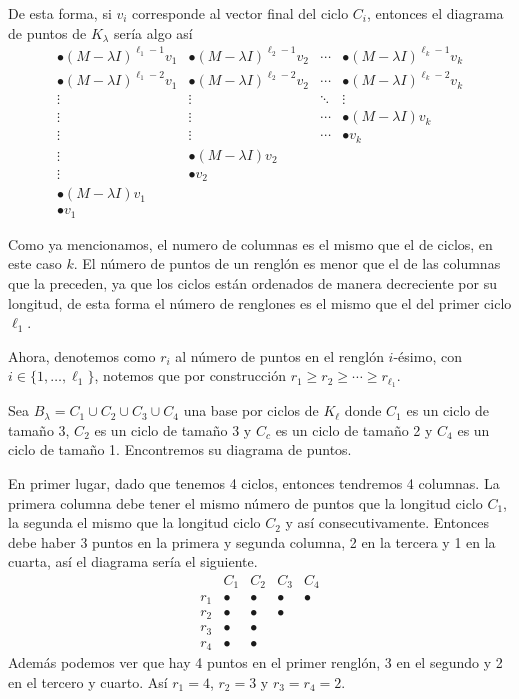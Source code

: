 De esta forma, si $v_i$ corresponde al vector final del ciclo $C_i$, entonces el diagrama de puntos de $K_\lambda
$ sería algo así
\[
  \begin{array}{llll} 
    \bullet (M-\lambda I)^{\ell_1-1}v_1 & \bullet (M-\lambda I)^{\ell_2-1}v_2 & \cdots & \bullet (M-\lambda I)^{\ell_k-1}v_k  \\
    \bullet (M-\lambda I)^{\ell_1-2}v_1 & \bullet (M-\lambda I)^{\ell_2-2}v_2 & \cdots & \bullet (M-\lambda I)^{\ell_k-2}v_k  \\
    \vdots & \vdots & \ddots & \vdots \\
    \vdots & \vdots & \cdots & \bullet (M-\lambda I)v_k \\
    \vdots & \vdots & \cdots & \bullet v_k \\
    \vdots & \bullet (M-\lambda I)v_2 \\
    \vdots & \bullet v_2 \\
    \bullet (M-\lambda I)v_1 \\
    \bullet v_1 
  \end{array}
\]

Como ya mencionamos, el numero de columnas es el mismo que el de ciclos, en este caso $k$. El número de puntos de un renglón es menor que el de las columnas que la preceden, ya que los ciclos están ordenados de manera decreciente por su longitud, de esta forma el número de renglones es el mismo que el del primer ciclo $\ell_1$. 

Ahora, denotemos como $r_i$ al número de puntos en el renglón $i$-ésimo, con $i \in \{1,\ldots,\ell_1\}$, notemos que por construcción $r_1 \geq r_2 \geq \cdots \geq r_{\ell_1}$.

\begin{example}
  Sea $B_\lambda = C_1 \cup C_2 \cup C_3 \cup C_4$ una base por ciclos de $K_\ell$ donde $C_1$ es un ciclo de tamaño 3, $C_2$ es un ciclo de tamaño 3 y $C_c$ es un ciclo de tamaño 2 y $C_4$ es un ciclo de tamaño 1. Encontremos su diagrama de puntos.

  \examplesolution

  En primer lugar, dado que tenemos 4 ciclos, entonces tendremos 4 columnas. La primera columna debe tener el mismo número de puntos que la longitud ciclo $C_1$, la segunda el mismo que la longitud ciclo $C_2$ y así consecutivamente. Entonces debe haber 3 puntos en la primera y segunda columna, 2 en la tercera y 1 en la cuarta, así el diagrama sería el siguiente.
  \[
    \begin{array}{ccccc}
      & C_1 & C_2 & C_3 & C_4 \\
      r_1 & \bullet & \bullet & \bullet & \bullet \\
      r_2 & \bullet & \bullet & \bullet\\
      r_3 & \bullet & \bullet \\
      r_4 & \bullet & \bullet 
    \end{array}
  \]
  Además podemos ver que hay 4 puntos en el primer renglón, 3 en el segundo y 2 en el tercero y cuarto. Así $r_1 = 4$, $r_2 = 3$ y $r_3 = r_4 = 2$.
\end{example}


